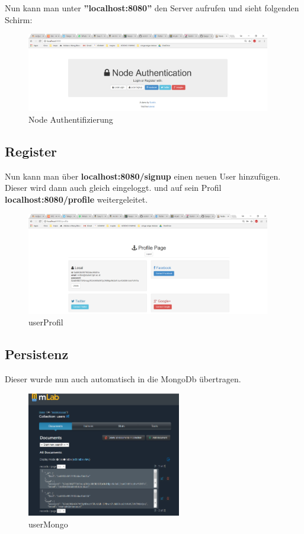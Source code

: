 \clearpage

Nun kann man unter \textbf{''localhost:8080''} den Server aufrufen und sieht folgenden Schirm:

\begin{figure}[!h] 
	\centering
	\includegraphics[width=0.95\textwidth]{images/localhost8080.PNG}
	\caption{Node Authentifizierung}
	\label{fig:Node Authentifizierung}
\end{figure}

\subsection{Register}
Nun kann man über \textbf{localhost:8080/signup} einen neuen User hinzufügen. Dieser wird dann auch gleich eingeloggt. und auf sein Profil \textbf{localhost:8080/profile} weitergeleitet.

\begin{figure}[!h] 
	\centering
	\includegraphics[width=0.95\textwidth]{images/prfile.PNG}
	\caption{userProfil}
	\label{fig:userProfil}
\end{figure}

\clearpage

\subsection{Persistenz}

Dieser wurde nun auch automatisch in die MongoDb übertragen.
\begin{figure}[!h] 
	\centering
	\includegraphics[width=0.60\textwidth]{images/userMongo.PNG}
	\caption{userMongo}
	\label{fig:userMongo}
\end{figure}

